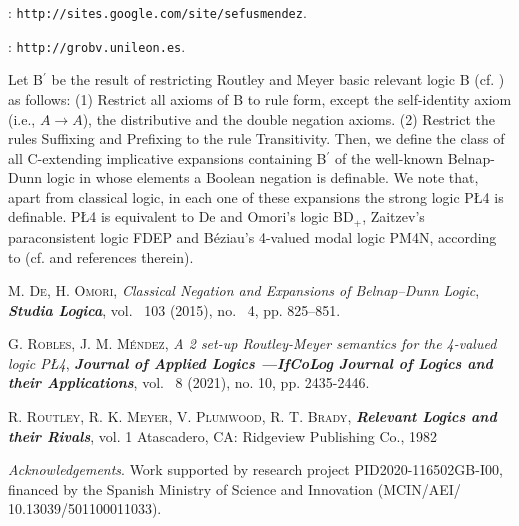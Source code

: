 \documentclass[bsl,meeting]{asl}
\def\urladdr#1{\endgraf\noindent{\it URL Address}: {\tt #1}.}
\newcommand{\NP}{}
\begin{document}
\thispagestyle{empty}


\NP  
{}
\urladdr{http://sites.google.com/site/sefusmendez}

\urladdr{http://grobv.unileon.es}



Let B$^{\prime}$ be the result of restricting Routley and Meyer basic relevant logic B (cf. \cite{RMPB}) as follows: (1) Restrict all axioms of B to rule form, except the self-identity axiom (i.e., $A\rightarrow A$), the distributive and the double negation axioms. (2) Restrict the rules Suffixing and Prefixing to the rule Transitivity. Then, we define the class of all C-extending implicative expansions containing B$^{\prime}$ of the well-known Belnap-Dunn logic in whose elements a Boolean negation is definable. We note that, apart from classical logic, in each one of these expansions the strong logic P\L 4 is definable. P\L 4 is equivalent to De and Omori's logic BD$_{+}$, Zaitzev's paraconsistent logic FDEP and B\'{e}ziau's 4-valued modal logic PM4N, according to \cite{DO15} (cf. \cite{RoMen21} and references therein).


\begin{thebibliography}{10}

{\scshape M. De, H. Omori},
{\itshape Classical Negation and Expansions of Belnap–Dunn Logic},
{\bfseries\itshape Studia Logica}, 
vol. ~103 (2015), no. ~4, pp. 825–851.


{\scshape G. Robles, J. M. M\'{e}ndez},
{\itshape A 2 set-up Routley-Meyer semantics for the 4-valued logic PŁ4},
{\bfseries\itshape 	Journal of Applied Logics ---IfCoLog Journal of Logics and their Applications},
vol. ~8 (2021), no. 10, pp. 2435-2446.

{\scshape R. Routley, R. K. Meyer, V. Plumwood, R. T. Brady},
{\bfseries\itshape Relevant Logics and their Rivals},
vol. 1
Atascadero, CA: Ridgeview Publishing Co.,
1982


\end{thebibliography}


\vspace*{-0.5\baselineskip}

\medskip
{\itshape Acknowledgements}. Work supported by research project PID2020-116502GB-I00, financed by the Spanish Ministry of Science and Innovation (MCIN/AEI/ \\ 10.13039/501100011033).
\end{document}
